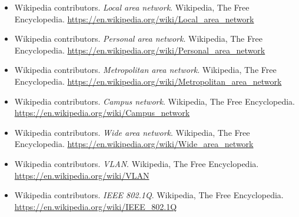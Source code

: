 \documentclass[12pt,a4paper]{article}
\begin{document}
\begin{itemize}
    \item Wikipedia contributors. \textit{Local area network}. Wikipedia, The Free Encyclopedia. \url{https://en.wikipedia.org/wiki/Local_area_network}
    \item Wikipedia contributors. \textit{Personal area network}. Wikipedia, The Free Encyclopedia. \url{https://en.wikipedia.org/wiki/Personal_area_network}
    \item Wikipedia contributors. \textit{Metropolitan area network}. Wikipedia, The Free Encyclopedia. \url{https://en.wikipedia.org/wiki/Metropolitan_area_network}
    \item Wikipedia contributors. \textit{Campus network}. Wikipedia, The Free Encyclopedia. \url{https://en.wikipedia.org/wiki/Campus_network}
    \item Wikipedia contributors. \textit{Wide area network}. Wikipedia, The Free Encyclopedia. \url{https://en.wikipedia.org/wiki/Wide_area_network}
    \item Wikipedia contributors. \textit{VLAN}. Wikipedia, The Free Encyclopedia. \url{https://en.wikipedia.org/wiki/VLAN}
    \item Wikipedia contributors. \textit{IEEE 802.1Q}. Wikipedia, The Free Encyclopedia. \url{https://en.wikipedia.org/wiki/IEEE_802.1Q}
\end{itemize}
\end{document}
